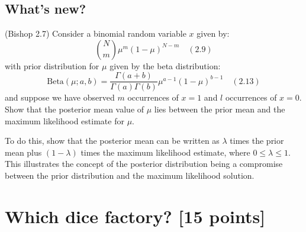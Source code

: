 \documentclass[11pt]{exam}
\begin{document}

\subsection{What's new?}

(Bishop 2.7) Consider a binomial random variable $x$ given by:
$$\binom{N}{m}\mu^m (1-\mu)^{N-m} \quad (2.9)$$
with prior distribution for $\mu$ given by the beta distribution:
$$ \text{Beta}(\mu;a,b)=\frac{\Gamma(a+b)}{\Gamma(a)\Gamma(b)} \mu^{a-1}(1-\mu)^{b-1} \quad (2.13)$$
and suppose we have observed $m$ occurrences of $x=1$ and $l$
occurrences of $x=0$.  Show that the posterior mean value of $\mu$
lies between the prior mean and the maximum likelihood estimate for
$\mu$.

To do this, show that the posterior mean can be written as $\lambda$
times the prior mean plus $(1-\lambda)$ times the maximum likelihood
estimate, where $0 \le \lambda \le 1$. This illustrates the concept of
the posterior distribution being a compromise between the prior
distribution and the maximum likelihood solution.



\section{Which dice factory? [15 points]}
\end{document}
